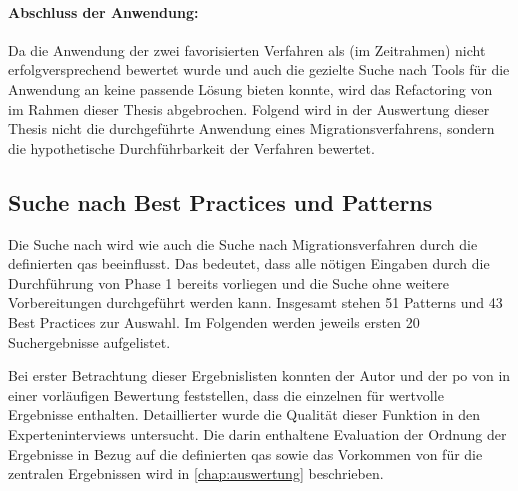 \paragraph{Abschluss der Anwendung:} Da die Anwendung der zwei favorisierten Verfahren als (im Zeitrahmen) nicht erfolgversprechend bewertet wurde und auch die gezielte Suche nach Tools für die Anwendung an \jf keine passende Lösung bieten konnte, wird das Refactoring von \jf im Rahmen dieser Thesis abgebrochen.
Folgend wird in der Auswertung dieser Thesis nicht die durchgeführte Anwendung eines Migrationsverfahrens, sondern die hypothetische Durchführbarkeit der Verfahren bewertet.

\subsection{Suche nach Best Practices und Patterns}

Die Suche nach \bpp wird wie auch die Suche nach Migrationsverfahren durch die definierten \glspl{qa} beeinflusst.
Das bedeutet, dass alle nötigen Eingaben durch die Durchführung von Phase 1 bereits vorliegen und die Suche ohne weitere Vorbereitungen durchgeführt werden kann.
Insgesamt stehen 51 Patterns und 43 Best Practices zur Auswahl.
Im Folgenden werden jeweils ersten 20 Suchergebnisse aufgelistet.



Bei erster Betrachtung dieser Ergebnislisten konnten der Autor und der \gls{po} von \jf in einer vorläufigen Bewertung feststellen, dass die einzelnen \bpp für \jf wertvolle Ergebnisse enthalten.
Detaillierter wurde die Qualität dieser Funktion in den Experteninterviews untersucht.
Die darin enthaltene Evaluation der Ordnung der Ergebnisse in Bezug auf die definierten \glspl{qa} sowie das Vorkommen von für die \ff zentralen Ergebnissen wird in \cref{chap:auswertung} beschrieben.



